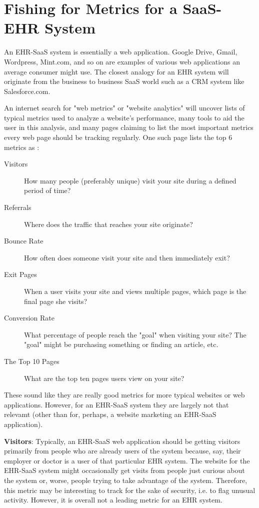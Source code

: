 \documentclass[10pt]{article}
\begin{document}
\section{Fishing for Metrics for a SaaS-EHR System}
\label{sec:EHR-SaaS-Metrics}


An EHR-SaaS system is essentially a web application.
Google Drive, Gmail, Wordpress, Mint.com, and so on are examples of various web applications an average consumer might use.
The closest analogy for an EHR system will originate from the business to business SaaS world such as a CRM system like Salesforce.com.

An internet search for "web metrics" or "website analytics" will uncover lists of typical metrics used to analyze a website's performance, many tools to aid the user in this analysis, and many pages claiming to list the most important metrics every web page should be tracking regularly.
One such page lists the top 6 metrics as \cite{top-6-metrics}:
\begin{description}
	\item[Visitors] How many people (preferably unique) visit your site during a defined period of time?
	\item[Referrals] Where does the traffic that reaches your site originate?
	\item[Bounce Rate] How often does someone visit your site and then immediately exit?
	\item[Exit Pages] When a user visits your site and views multiple pages, which page is the final page she visits?
	\item[Conversion Rate] What percentage of people reach the "goal" when visiting your site? The "goal" might be purchasing something or finding an article, etc.
	\item[The Top 10 Pages] What are the top ten pages users view on your site?
\end{description}

These sound like they are really good metrics for more typical websites or web applications.
However, for an EHR-SaaS system they are largely not that relevamt (other than for, perhaps, a website marketing an EHR-SaaS application).

\textbf{Visitors}: Typically, an EHR-SaaS web application should be getting visitors primarily from people who are already users of the system because, say, their employer or doctor is a user of that particular EHR system.
The website for the EHR-SaaS system might occasionally get visits from people just curious about the system or, worse, people trying to take advantage of the system.
Therefore, this metric may be interesting to track for the sake of security, i.e. to flag unusual activity.
However, it is overall not a leading metric for an EHR system.
\end{document}
